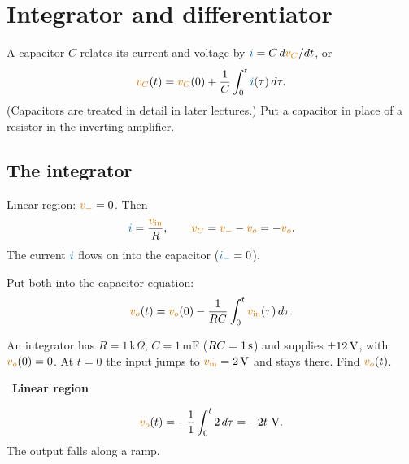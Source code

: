 \documentclass[11pt,a4paper]{article}
\newcommand{\Icol}[1]{\textcolor{ccur}{#1}}
\newcommand{\Vcol}[1]{\textcolor{cvolt}{#1}}
\newif\ifsolfirst
\newcommand{\solution}{\par\smallskip\noindent{\color{cpow}\bfseries Solution}\par\nobreak\smallskip\global\solfirsttrue}
\newcommand{\solstep}[2]{\par\ifsolfirst\global\solfirstfalse\else\bigskip\needspace{5\baselineskip}\fi
  \noindent{\color{cpow}\bfseries Step #1.}\ {\bfseries #2}\par\nobreak\smallskip}
\newcommand{\kohm}{\,\mathrm{k}\Omega}
\newcommand{\mF}{\,\mathrm{mF}}
\newcommand{\vin}{\Vcol{v_{\mathrm{in}}}}
\newcommand{\vo}{\Vcol{v_o}}
\newcommand{\vm}{\Vcol{v_-}}
\newcommand{\im}{\Icol{i_-}}
\newcommand{\intdiff}[1]{%
  \node[oa] (A) at (0,0) {};
  \ifnum#1=0
    \draw (A.-) -- ++(-0.4,0) coordinate (n) to[R, l_=$R$] ++(-2.0,0) coordinate (s);
    \draw (n) -- ++(0,1.3) coordinate (f) to[C, l_=$C$] (f -| A.out) -- (A.out);
    \node[pol] at ($(f)+(0.45,0.38)$) {$+$}; \node[pol] at ($(f -| A.out)+(-0.45,0.38)$) {$-$};
    \node[font=\small, text=cvolt] at ($(f)!0.5!(f -| A.out)+(0,0.45)$) {$v_C$};
    \draw[iar] ($(s)+(0.35,0.28)$) -- ++(0.5,0); \node[font=\small, text=ccur, above] at ($(s)+(0.6,0.28)$) {$i$};
  \else
    \draw (A.-) -- ++(-0.4,0) coordinate (n) to[C, l_=$C$] ++(-2.0,0) coordinate (s);
    \draw (n) -- ++(0,1.3) coordinate (f) to[R, l=$R$] (f -| A.out) -- (A.out);
    \node[pol] at ($(s)+(0.35,0.42)$) {$+$}; \node[pol] at ($(n)+(-0.35,0.42)$) {$-$};
    \draw[iar] ($(f)+(0.3,0.32)$) -- ++(0.5,0); \node[font=\small, text=ccur, above] at ($(f)+(0.55,0.32)$) {$i$};
  \fi
  \draw (s) to[american voltage source, l_=$\Vcol{v_{\mathrm{in}}}$] ($(s)+(0,-1.8)$) node[ground] {};
  \draw (A.+) -- ++(-0.4,0) -- ++(0,-0.4) node[ground] {};
  \draw (A.out) -- ++(0.8,0) node[ocirc] {} node[right, font=\small, text=cvolt] {$v_o$};
  \fill (n) circle (1.6pt); \fill (A.out) circle (1.6pt);}
\newcommand{\xtu}[2]{\draw ([yshift=2pt]#1,0) -- ([yshift=-2pt]#1,0); \node[above, font=\scriptsize] at (#1,0) {#2};}
\newcommand{\yt}[2]{\draw ([xshift=2pt]0,#1) -- ([xshift=-2pt]0,#1) node[left, font=\scriptsize] {#2};}
\begin{document}
\section{Integrator and differentiator}

A capacitor $C$ relates its current and voltage by $\Icol{i} = C\,d\Vcol{v_C}/dt$, or
\[
  \Vcol{v_C}(t) = \Vcol{v_C}(0) + \frac{1}{C}\int_0^t \Icol{i}(\tau)\,d\tau .
\]
(Capacitors are treated in detail in later lectures.) Put a capacitor in place of a resistor in
the inverting amplifier.

\subsection{The integrator}

\begin{minipage}[c]{0.46\linewidth}
\centering
{}
\end{minipage}\hfill
\begin{minipage}[c]{0.5\linewidth}
Linear region: $\vm = 0$. Then
\[
  \Icol{i} = \frac{\vin}{R}, \qquad \Vcol{v_C} = \vm - \vo = -\vo .
\]
The current $\Icol{i}$ flows on into the capacitor ($\im = 0$).
\end{minipage}

Put both into the capacitor equation:
\[
  \vo(t) = \vo(0) - \frac{1}{RC}\int_0^t \vin(\tau)\,d\tau .
\]

\bigskip
\begin{examplebox}
An integrator has $R = 1\kohm$, $C = 1\mF$ ($RC = 1\,\mathrm{s}$) and supplies $\pm 12\,\mathrm{V}$, with
$\vo(0) = 0$. At $t = 0$ the input jumps to $\vin = 2\V$ and stays there. Find $\vo(t)$.
\end{examplebox}

\solution

\solstep{1}{Linear region}
\begin{minipage}[c]{0.52\linewidth}
\[
  \vo(t) = -\frac{1}{1}\int_0^t 2\,d\tau = -2t \ \mathrm{V}.
\]
The output falls along a ramp.
\end{minipage}\hfill
\begin{minipage}[c]{0.44\linewidth}
\centering
{}
\end{minipage}
\end{document}
